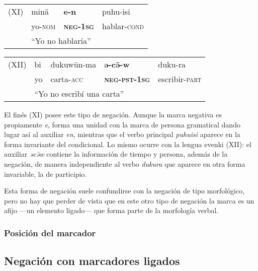 {\setmainfont{Charis SIL} 


\begin{tabular}{llll}
(XI) & minä & \textbf{e-n} & puhu-isi \\
& yo-\textsc{nom} & \textsc{\textbf{neg-1sg}} & hablar-\textsc{cond} \\
& \multicolumn{3}{l}{``Yo no hablaría''} \qquad \textcolor{MidnightBlue}{\citep[pag. 376]{Mitchell1991}}
\end{tabular} \vspace{0.5cm}

\begin{tabular}{lllll}
(XII) & bi & dukuwūn-ma & \textbf{ə-cə̄-w} & duku-ra \\
& yo & carta-\textsc{acc} & \textsc{\textbf{neg-pst-1sg}} & escribir-\textsc{part} \\
& \multicolumn{4}{l}{``Yo no escribí una carta'' \qquad \textcolor{MidnightBlue}{\citep[pág. 213]{Payne85}}}
\end{tabular} \vspace{0.5cm}

} %

El finés (XI) posee este tipo de negación. Aunque la marca negativa es propiamente {\setmainfont{Charis SIL} \textit{e}}, forma una unidad con la marca de persona gramatical dando lugar así al auxiliar {\setmainfont{Charis SIL} \textit{en}}, mientras que el verbo principal {\setmainfont{Charis SIL} \textit{puhuisi}} aparece en la forma invariante del condicional. Lo mismo ocurre con la lengua evenki (XII): el auxiliar {\setmainfont{Charis SIL} \textit{əcə̄w}} contiene la información de tiempo y persona, además de la negación, de manera independiente al verbo {\setmainfont{Charis SIL} \textit{dukura}} que aparece en otra forma invariable, la de participio.

Esta forma de negación suele confundirse con la negación de tipo morfológico, pero no hay que perder de vista que en este otro tipo de negación la marca es un afijo —un elemento ligado— que forma parte de la morfología verbal.

\subsubsection*{Posición del marcador}


\subsection*{Negación con marcadores ligados}
